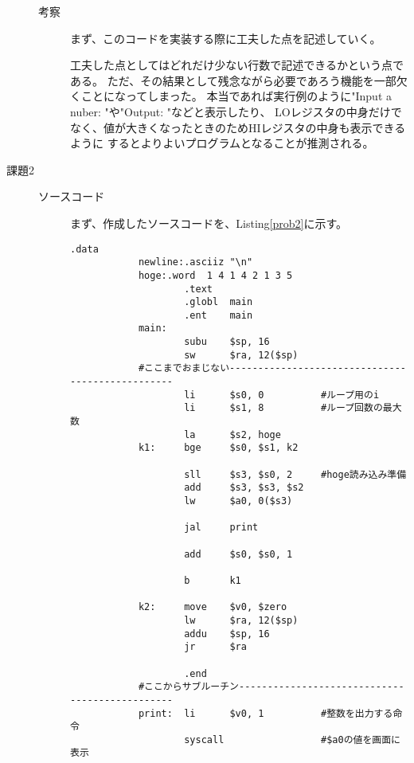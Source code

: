 \documentclass{jsarticle}
\begin{document}
\begin{description}
\begin{description}
            \item[考察]
            まず、このコードを実装する際に工夫した点を記述していく。

            工夫した点としてはどれだけ少ない行数で記述できるかという点である。
            ただ、その結果として残念ながら必要であろう機能を一部欠くことになってしまった。
            本当であれば実行例のように"Input a nuber: "や"Output: "などと表示したり、
            LOレジスタの中身だけでなく、値が大きくなったときのためHIレジスタの中身も表示できるように
            するとよりよいプログラムとなることが推測される。
            \\
        \end{description}

        \item[課題2]
        \begin{description}
            \item[ソースコード]
            まず、作成したソースコードを、Listing\ref{prob2}に示す。
            \begin{lstlisting}[caption=課題2のソースコード, label=prob2]
                    .data
            newline:.asciiz "\n"
            hoge:.word  1 4 1 4 2 1 3 5
                    .text
                    .globl  main
                    .ent    main
            main:
                    subu    $sp, 16
                    sw      $ra, 12($sp)
            #ここまでおまじない-------------------------------------------------
                    li      $s0, 0          #ループ用のi
                    li      $s1, 8          #ループ回数の最大数
                    la      $s2, hoge
            k1:     bge     $s0, $s1, k2

                    sll     $s3, $s0, 2     #hoge読み込み準備
                    add     $s3, $s3, $s2
                    lw      $a0, 0($s3)

                    jal     print

                    add     $s0, $s0, 1

                    b       k1

            k2:     move    $v0, $zero
                    lw      $ra, 12($sp)
                    addu    $sp, 16
                    jr      $ra

                    .end
            #ここからサブルーチン-----------------------------------------------
            print:  li      $v0, 1          #整数を出力する命令
                    syscall                 #$a0の値を画面に表示


\end{lstlisting}
\end{description}
\end{description}
\end{document}
